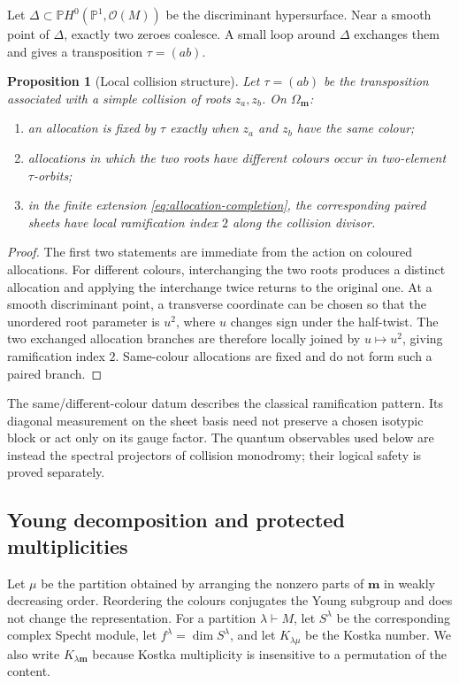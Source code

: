 \documentclass[11pt]{article}
\newtheorem{proposition}[theorem]{Proposition}
\theoremstyle{definition}
\theoremstyle{remark}
\newcommand{\Pp}{\mathbb P}
\newcommand{\cO}{\mathcal O}
\begin{document}
Let $\Delta\subset\Pp H^0(\Pp^1,\cO(M))$ be the discriminant hypersurface.  Near a smooth point of $\Delta$, exactly two zeroes coalesce.  A small loop around $\Delta$ exchanges them and gives a transposition $\tau=(ab)$.

\begin{proposition}[Local collision structure]\label{prop:local-collision}
Let $\tau=(ab)$ be the transposition associated with a simple collision of roots $z_a,z_b$.  On $\Omega_{\boldsymbol m}$:
\begin{enumerate}
\item an allocation is fixed by $\tau$ exactly when $z_a$ and $z_b$ have the same colour;
\item allocations in which the two roots have different colours occur in two-element $\tau$-orbits;
\item in the finite extension \eqref{eq:allocation-completion}, the corresponding paired sheets have local ramification index $2$ along the collision divisor.
\end{enumerate}
\end{proposition}

\begin{proof}
The first two statements are immediate from the action on coloured allocations.  For different colours, interchanging the two roots produces a distinct allocation and applying the interchange twice returns to the original one.  At a smooth discriminant point, a transverse coordinate can be chosen so that the unordered root parameter is $u^2$, where $u$ changes sign under the half-twist.  The two exchanged allocation branches are therefore locally joined by $u\mapsto u^2$, giving ramification index $2$.  Same-colour allocations are fixed and do not form such a paired branch.
\end{proof}

The same/different-colour datum describes the classical ramification pattern.  Its diagonal measurement on the sheet basis need not preserve a chosen isotypic block or act only on its gauge factor.  The quantum observables used below are instead the spectral projectors of collision monodromy; their logical safety is proved separately.

\subsection{Young decomposition and protected multiplicities}

Let $\mu$ be the partition obtained by arranging the nonzero parts of $\boldsymbol m$ in weakly decreasing order.  Reordering the colours conjugates the Young subgroup and does not change the representation.  For a partition $\lambda\vdash M$, let $S^\lambda$ be the corresponding complex Specht module, let $f^\lambda=\dim S^\lambda$, and let $K_{\lambda\mu}$ be the Kostka number.  We also write $K_{\lambda\boldsymbol m}$ because Kostka multiplicity is insensitive to a permutation of the content.
\end{document}
